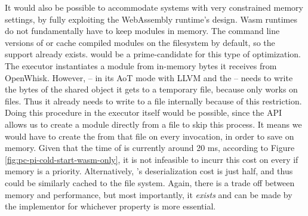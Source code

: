 It would also be possible to accommodate systems with very constrained memory settings, by fully exploiting the WebAssembly runtime's design. Wasm runtimes do not fundamentally have to keep modules in memory. The command line versions of  or  cache compiled modules on the filesystem by default, so the support already exists.  would be a prime-candidate for this type of optimization. The executor instantiates a module from in-memory bytes it receives from OpenWhisk. However,  -- in its AoT mode with LLVM and the  -- needs to write the bytes of the shared object it gets to a temporary file, because  only works on files. Thus it already needs to write to a file internally because of this restriction. Doing this procedure in the executor itself would be possible, since the API allows us to create a module directly from a file to skip this process. It means we would have to create the  from that file on every  invocation, in order to save on memory. Given that the  time of  is currently around 20 ms, according to Figure \ref{fig:pc-pi-cold-start-wasm-only}, it is not infeasible to incurr this cost on every  if memory is a priority. Alternatively, 's deserialization cost is just half, and thus could be similarly cached to the file system. Again, there is a trade off between memory and performance, but most importantly, it \emph{exists} and can be made by the implementor for whichever property is more essential.
